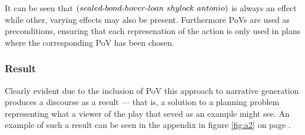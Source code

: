 It can be seen that $(sealed\text{-} bond\text{-} hover\text{-} loan\ shylock\ antonio)$ is always an effect while other, varying effects may also be present. Furthermore PoVs are used as preconditions, ensuring that each represenation of the action is only used in plans where the corresponding PoV has been chosen.%

\subsubsection{Result}
Clearly evident due to the inclusion of PoV this approach to narrative generation produces a discourse as a result --- that is, a solution to a planning problem representing what a viewer of the play that seved as an example might see. An example of such a result can be seen in the appendix in figure \ref{fig:a2} on page \pageref{fig:a2}.
